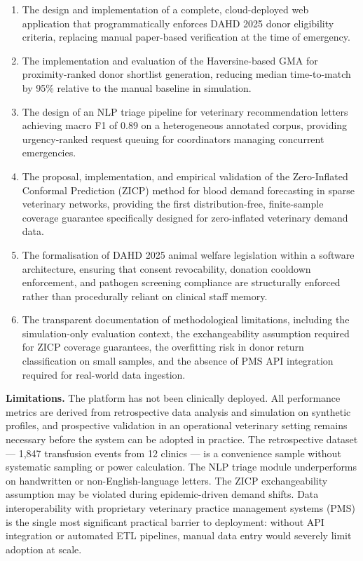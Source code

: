 \documentclass[12pt,a4paper]{article}
\begin{document}
\begin{enumerate}[leftmargin=1.8em, itemsep=0.5em]
    \item The design and implementation of a complete, cloud-deployed web application that programmatically enforces DAHD 2025 donor eligibility criteria, replacing manual paper-based verification at the time of emergency.
    \item The implementation and evaluation of the Haversine-based GMA for proximity-ranked donor shortlist generation, reducing median time-to-match by 95\% relative to the manual baseline in simulation.
    \item The design of an NLP triage pipeline for veterinary recommendation letters achieving macro F1 of 0.89 on a heterogeneous annotated corpus, providing urgency-ranked request queuing for coordinators managing concurrent emergencies.
    \item The proposal, implementation, and empirical validation of the Zero-Inflated Conformal Prediction (ZICP) method for blood demand forecasting in sparse veterinary networks, providing the first distribution-free, finite-sample coverage guarantee specifically designed for zero-inflated veterinary demand data.
    \item The formalisation of DAHD 2025 animal welfare legislation within a software architecture, ensuring that consent revocability, donation cooldown enforcement, and pathogen screening compliance are structurally enforced rather than procedurally reliant on clinical staff memory.
    \item The transparent documentation of methodological limitations, including the simulation-only evaluation context, the exchangeability assumption required for ZICP coverage guarantees, the overfitting risk in donor return classification on small samples, and the absence of PMS API integration required for real-world data ingestion.
\end{enumerate}

\vspace{1.5em}
\noindent\textbf{Limitations.} The platform has not been clinically deployed. All performance metrics are derived from retrospective data analysis and simulation on synthetic profiles, and prospective validation in an operational veterinary setting remains necessary before the system can be adopted in practice. The retrospective dataset — 1,847 transfusion events from 12 clinics — is a convenience sample without systematic sampling or power calculation. The NLP triage module underperforms on handwritten or non-English-language letters. The ZICP exchangeability assumption may be violated during epidemic-driven demand shifts. Data interoperability with proprietary veterinary practice management systems (PMS) is the single most significant practical barrier to deployment: without API integration or automated ETL pipelines, manual data entry would severely limit adoption at scale.
\end{document}
